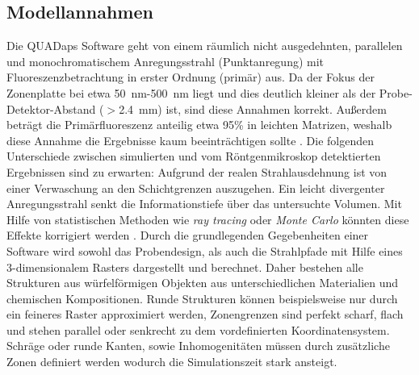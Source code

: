 \subsection{Modellannahmen} \label{modell}
Die QUADaps Software geht von einem räumlich nicht ausgedehnten, parallelen und monochromatischem Anregungsstrahl (Punktanregung) mit Fluoreszenzbetrachtung in erster Ordnung (primär) aus. Da der Fokus der Zonenplatte bei etwa \SI{50}{\nano\meter}-\SI{500}{\nano\meter} liegt und dies deutlich kleiner als der Probe-Detektor-Abstand ($>$\SI{2.4}{\milli\meter}) ist, sind diese Annahmen korrekt. Außerdem beträgt die Primärfluoreszenz anteilig etwa 95\% in leichten Matrizen, weshalb diese Annahme die Ergebnisse kaum beeinträchtigen sollte \cite[S.~33]{malzer}.\newline
Die folgenden Unterschiede zwischen simulierten und vom Röntgenmikroskop detektierten Ergebnissen sind zu erwarten: Aufgrund der realen Strahlausdehnung ist von einer Verwaschung an den Schichtgrenzen auszugehen. Ein leicht divergenter Anregungsstrahl senkt die Informationstiefe über das untersuchte Volumen. Mit Hilfe von statistischen Methoden wie \textit{ray tracing} oder \textit{Monte Carlo} könnten diese Effekte korrigiert werden \cite[S.~47]{hanna}.\newline
Durch die grundlegenden Gegebenheiten einer Software wird sowohl das Probendesign, als auch die Strahlpfade mit Hilfe eines 3-dimensionalem Rasters dargestellt und berechnet. Daher bestehen alle Strukturen aus würfelförmigen Objekten aus unterschiedlichen Materialien und chemischen Kompositionen. Runde Strukturen können beispielsweise nur durch ein feineres Raster approximiert werden, Zonengrenzen sind perfekt scharf, flach und stehen parallel oder senkrecht zu dem vordefinierten Koordinatensystem. Schräge oder runde Kanten, sowie Inhomogenitäten müssen durch zusätzliche Zonen definiert werden wodurch die Simulationszeit stark ansteigt.